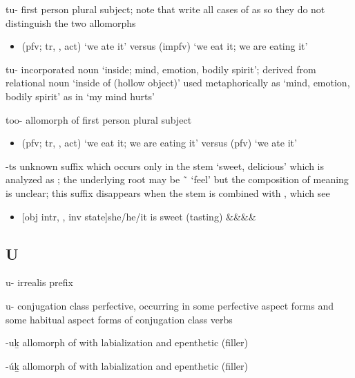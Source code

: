 \begin{morphdesc}[resume*=alphalist]
\item[tu-]
	first person plural subject;
	note that \cite{story-naish:1973} write all cases of  as 
		so they do not distinguish the two allomorphs
	\begin{itemize}
	\item	{} (pfv; tr, ,  act) ‘we ate it’\newline
		versus  (impfv) ‘we eat it; we are eating it’
	\end{itemize}

\item[tu-]
	incorporated noun ‘inside; mind, emotion, bodily spirit’;
	derived from relational noun  ‘inside of (hollow object)’
	used metaphorically as ‘mind, emotion, bodily spirit’ as in  ‘my mind hurts’

\item[too-]
	allomorph of first person plural subject 
	\begin{itemize}
	\item	{} (pfv; tr, ,  act) ‘we eat it; we are eating it’\newline
		versus  (pfv) ‘we ate it’
	\end{itemize}

\item[-ts]\label{m:-ts}
	unknown suffix which occurs only in the stem  ‘sweet, delicious’
		which is analyzed as ;
	the underlying root may be  \~\  ‘feel’
		but the composition of meaning is unclear;
	this suffix disappears when the stem  is combined with ,
		which see
	\begin{itemize}
	\item	{}[obj intr, , inv state]{she/he/it is sweet (tasting)}
				{&&&\·&\·}
	\end{itemize}
\end{morphdesc}

\subsection{U}\label{sec:alphalist-u}
\begin{morphdesc}[resume*=alphalist]
\item[u-]\label{m:u-irr}
	irrealis prefix

\item[u-]\label{m:u-pfv}
	 conjugation class perfective,
	occurring in some perfective aspect forms and some habitual aspect forms of
	 conjugation class verbs

\item[-uḵ]\label{m:-uḵ}
	allomorph of  with labialization and epenthetic (filler) 

\item[-úḵ]\label{m:-úḵ}
	allomorph of  with labialization and epenthetic (filler) 

\end{morphdesc}


